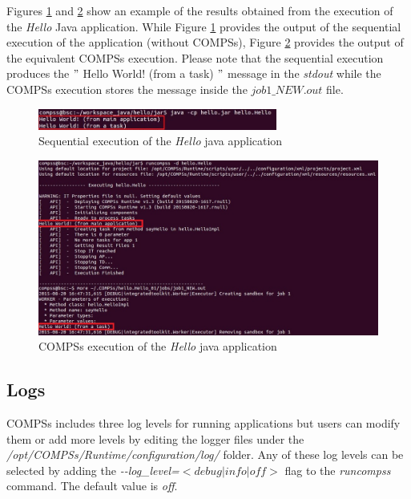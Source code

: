 Figures \ref{fig:hello_seq} and \ref{fig:hello_compss} show an example of the results obtained from the execution of the \textit{Hello} Java 
 application. While Figure \ref{fig:hello_seq} provides the output of the sequential execution of the application (without COMPSs), Figure \ref{fig:hello_compss}
provides the output of the equivalent COMPSs execution. Please note that the sequential execution produces the $"$ Hello World! (from a task) $"$ message
in the \textit{stdout} while the COMPSs execution stores the message inside the \textit{$job1\_NEW.out$} file.
\begin{figure}[h!]
  \centering
    \includegraphics[width=0.7\textwidth]{./Sections/3_Results_and_Logs/Figures/hello_seq_stdout.jpeg}
    \caption{Sequential execution of the \textit{Hello} java application}
    \label{fig:hello_seq}
\end{figure}

\begin{figure}[h!]
  \centering
    \includegraphics[width=\textwidth]{./Sections/3_Results_and_Logs/Figures/hello_compss_stdout_and_job.jpeg}
    \caption{COMPSs execution of the \textit{Hello} java application}
    \label{fig:hello_compss}
\end{figure}
\newpage

\subsection{Logs}
COMPSs includes three log levels for running applications but users can modify them or add more levels by editing the
logger files under the \textit{/opt/COMPSs/Runtime/configuration/log/} folder. Any of these log levels can be selected by 
adding the \textit{-{}-log\_level=$<debug | info | off>$} flag to the \textit{runcompss} command. The default value is \textit{off}.


